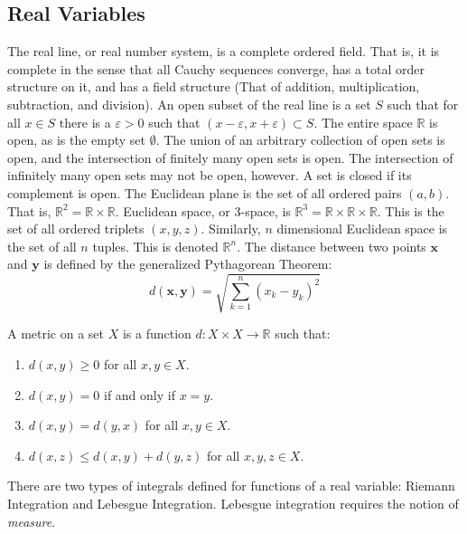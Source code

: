 \documentclass[crop=false,class=article,oneside]{standalone}
\begin{document}
    \subsection{Real Variables}
        The real line, or real number system, is a complete ordered
        field. That is, it is complete in the sense that all
        Cauchy sequences converge, has a total order structure
        on it, and has a field structure (That of addition,
        multiplication, subtraction, and division).
        An open subset of the real line is a set $S$ such that
        for all $x\in{S}$ there is a $\varepsilon>0$ such that
        $(x-\varepsilon,x+\varepsilon)\subset{S}$. The entire
        space $\mathbb{R}$ is open, as is the empty set
        $\emptyset$. The union of
        an arbitrary collection of open sets is open, and the
        intersection of finitely many open sets is open. The
        intersection of infinitely many open sets may not be
        open, however. A set is closed if its complement is
        open. The Euclidean plane is the set of all ordered
        pairs $(a,b)$. That is,
        $\mathbb{R}^{2}=\mathbb{R}\times\mathbb{R}$. Euclidean
        space, or 3-space, is
        $\mathbb{R}^{3}=\mathbb{R}\times\mathbb{R}\times\mathbb{R}$.
        This is the set of all ordered triplets $(x,y,z)$. Similarly,
        $n$ dimensional Euclidean space is the set of all
        $n$ tuples. This is denoted $\mathbb{R}^{n}$. The distance
        between two points $\mathbf{x}$ and $\mathbf{y}$ is defined
        by the generalized Pythagorean Theorem:
        \begin{equation*}
            d(\mathbf{x},\mathbf{y})=
            \sqrt{\sum_{k=1}^{n}(x_{k}-y_{k})^{2}}
        \end{equation*}
        \begin{definition}
            A metric on a set $X$ is a function
            $d:X\times{X}\rightarrow\mathbb{R}$ such that:
            \begin{enumerate}
                \item $d(x,y)\geq{0}$ for all $x,y\in{X}$.
                \item $d(x,y)=0$ if and only if $x=y$.
                \item $d(x,y)=d(y,x)$ for all $x,y\in{X}$.
                \item $d(x,z)\leq{d(x,y)+d(y,z)}$
                      for all $x,y,z\in{X}$.
            \end{enumerate}
        \end{definition}
        There are two types of integrals defined for functions
        of a real variable: Riemann Integration and Lebesgue Integration.
        Lebesgue integration requires the notion of \textit{measure}.
\end{document}

